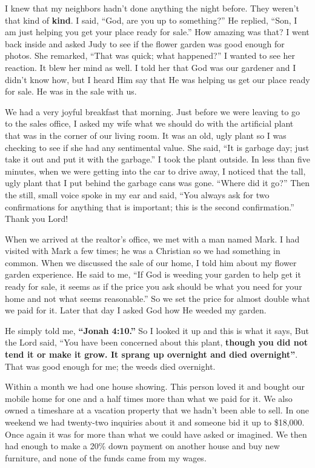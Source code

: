 \documentclass[twoside, 12pt]{book}
\begin{document}
I knew that my neighbors hadn’t done anything the night before. They weren’t that kind of \textbf{kind}. I said, “God, are you up to something?” He replied, “Son, I am just helping you get your place ready for sale.” How amazing was that? I went back inside and asked Judy to see if the flower garden was good enough for photos. She remarked, “That was quick; what happened?” I  wanted to see her reaction. It blew her mind as well. I told her that God was our gardener and I didn’t know how, but I heard Him say that He was helping us get our place ready for sale. He was in the sale with us.

We had a very joyful breakfast that morning. Just before we were leaving to go to the sales office, I asked my wife what we should do with the artificial plant that was in the corner of our living room. It was an old, ugly plant so I was checking to see if she had any sentimental value. She said, “It is garbage day; just take it out and put it with the garbage.” I took the plant outside. In less than five minutes, when we were getting into the car to drive away, I noticed that the tall, ugly plant that I put behind the garbage cans was gone. “Where did it go?” Then the still, small voice spoke in my ear and said, “You always ask for two confirmations for anything that is important; this is the second confirmation.” Thank you Lord!

When we arrived at the realtor’s office, we met with a man named Mark. I had visited with Mark a few times; he was a Christian so we had something in common. When we discussed the sale of our home, I told him about my flower garden experience. He said to me, “If God is weeding your garden to help get it ready for sale, it seems as if the price you ask should be what you need for your home and not what seems reasonable.” So we set the price for almost double what we paid for it. Later that day I asked God how He weeded my garden.

He simply told me, \textbf{“Jonah 4:10.”} So I looked it up and this is what it says, But the Lord said, “You have been concerned about this plant, \textbf{though you did not tend it or make it grow. It sprang up overnight and died overnight”}. That was good enough for me; the weeds died overnight.

Within a month we had one house showing. This person loved it and bought our mobile home for one and a half times more than what we paid for it. We also owned a timeshare at a vacation property that we hadn’t been able to sell. In one weekend we had twenty-two inquiries about it and someone bid it up to \$18,000. Once again it was for more than what we could have asked or imagined. We then had enough to make a 20\% down payment on another house and buy new furniture, and none of the funds came from my wages.
\end{document}
